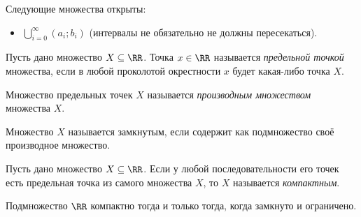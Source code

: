 \documentclass[12pt,a4paper]{article}
\begin{document}
    \begin{example}
        Следующие множества открыты:
        \begin{itemize}
            \item $\bigcup_{i=0}^\infty (a_i; b_i)$ (интервалы не обязательно не должны пересекаться).
        \end{itemize}
    \end{example}

    \begin{definition}
        Пусть дано множество $X\subseteq \RR$. Точка $x \in \RR$ называется \emph{предельной точкой} множества, если в любой проколотой окрестности $x$ будет какая-либо точка $X$.
        
        Множество предельных точек $X$ называется \emph{производным множеством} множества $X$.

        Множество $X$ называется замкнутым, если содержит как подмножество своё производное множество.
    \end{definition}

    \begin{definition}
        Пусть дано множество $X\subseteq \RR$. Если у любой последовательности его точек есть предельная точка из самого множества $X$, то $X$ называется \emph{компактным}.
    \end{definition}

    \begin{theorem}
        Подмножество $\RR$ компактно тогда и только тогда, когда замкнуто и ограничено.
    \end{theorem}
\end{document}

